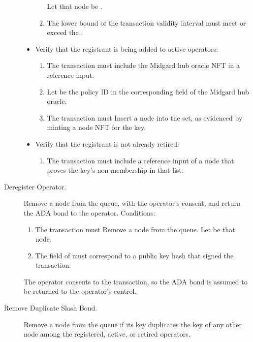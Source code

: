 \documentclass[../midgard.tex]{subfiles}
\begin{document}
\begin{description}
\begin{itemize}
\begin{enumerate}
                  Let that node be .
                \item The lower bound of the transaction validity interval must meet or exceed the .
            \end{enumerate}
            \item Verify that the registrant is being added to active operators:
            \begin{enumerate}[resume]
                \item The transaction must include the Midgard hub oracle NFT in a reference input.
                \item Let  be the policy ID in the corresponding field of the Midgard hub oracle.
                \item The transaction must Insert a node into the  set, as evidenced by minting a  node NFT for the  key.
            \end{enumerate}
            \item Verify that the registrant is not already retired:
            \begin{enumerate}[resume]
                \item The transaction must include a reference input of a  node that proves the  key's non-membership in that list.
            \end{enumerate}
        \end{itemize}
    \item[Deregister Operator.] Remove a node from the  queue, with the operator's consent, and return the ADA bond to the operator.
      Conditions:
        \begin{enumerate}
            \item The transaction must Remove a node from the  queue.
              Let  be that node.
            \item The  field of  must correspond to a public key hash that signed the transaction.
        \end{enumerate}
    The operator consents to the transaction, so the ADA bond is assumed to be returned to the operator's control.
    \item[Remove Duplicate Slash Bond.] Remove a node from the  queue if its key duplicates the key of any other node among the registered, active, or retired operators.

\end{description}
\end{document}
